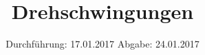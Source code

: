 

\subject{VERSUCH NUMMER 102}
\title{Drehschwingungen}
\date{
  Durchführung: 17.01.2017
  \hspace{3em}
  Abgabe: 24.01.2017
}




\thispagestyle{empty}
\maketitle
\thispagestyle{empty}
\tableofcontents
\setcounter{page}{1}
\newpage







\nocite{*}
\printbibliography



